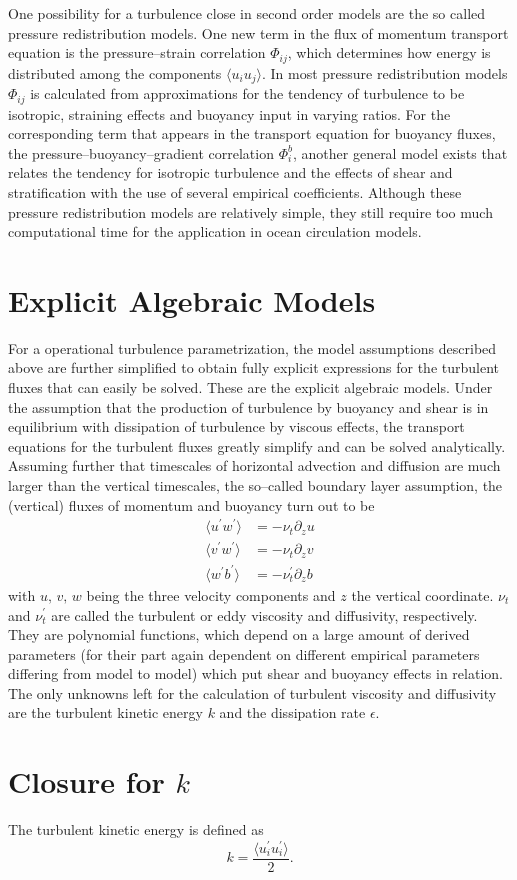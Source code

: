 One possibility for a turbulence close in second order models are the so called pressure redistribution models. One new term in the flux of momentum transport equation is the pressure--strain correlation $\Phi_{ij}$, which determines how energy is distributed among the components $\langle u_i u_j \rangle$. In most pressure redistribution models $\Phi_{ij}$ is calculated from approximations for the tendency of turbulence to be isotropic, straining effects and buoyancy input in varying ratios. For the corresponding term that appears in the transport equation for buoyancy fluxes, the pressure--buoyancy--gradient correlation $\Phi_i^b$, another general model exists that relates the tendency for isotropic turbulence and the effects of shear and stratification with the use of several empirical coefficients. Although these pressure redistribution models are relatively simple, they still require too much computational time for the application in ocean circulation models.

\section{Explicit Algebraic Models}

For a operational turbulence parametrization, the model assumptions described above are further simplified to obtain fully explicit expressions for the turbulent fluxes that can easily be solved. These are the explicit algebraic models. Under the assumption that the production of turbulence by buoyancy and shear is in equilibrium with dissipation of turbulence by viscous effects, the transport equations for the turbulent fluxes greatly simplify and can be solved analytically. Assuming further that timescales of horizontal advection and diffusion are much larger than the vertical timescales, the so--called boundary layer assumption, the (vertical) fluxes of momentum and buoyancy turn out to be
\begin{align}
 \label{bblassum}
 \langle u^\prime w^\prime \rangle &= - \nu_t \partial_z u \\
 \langle v^\prime w^\prime \rangle &= - \nu_t \partial_z v \\
 \langle w^\prime b^\prime \rangle &= - \nu_t^\prime \partial_z b
\end{align}
with $u,\,v,\,w$ being the three velocity components and $z$ the vertical coordinate. $\nu_t$ and $\nu_t^\prime$ are called the turbulent or eddy viscosity and diffusivity, respectively. They are polynomial functions, which depend on a large amount of derived parameters (for their part again dependent on different empirical parameters differing from model to model) which put shear and buoyancy effects in relation. The only unknowns left for the calculation of turbulent viscosity and diffusivity are the turbulent kinetic energy $k$ and the dissipation rate $\epsilon$. 

\section{Closure for $k$}

The turbulent kinetic energy is defined as
\begin{equation}
 \label{TKE}
 k = \frac{\langle u_i^\prime u_i^\prime \rangle}{2}.
\end{equation}
